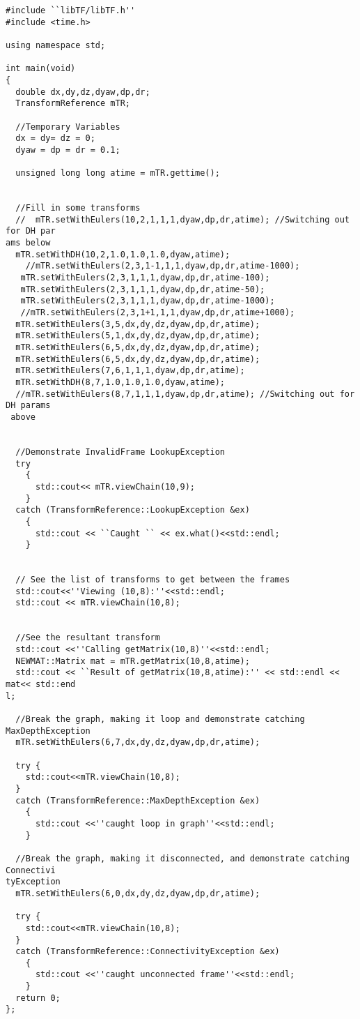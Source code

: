 \documentclass[12pt]{article}
\begin{document}
\begin{verbatim}
#include ``libTF/libTF.h''
#include <time.h>

using namespace std;

int main(void)
{
  double dx,dy,dz,dyaw,dp,dr;
  TransformReference mTR;
  
  //Temporary Variables
  dx = dy= dz = 0;
  dyaw = dp = dr = 0.1;
  
  unsigned long long atime = mTR.gettime();

  
  //Fill in some transforms
  //  mTR.setWithEulers(10,2,1,1,1,dyaw,dp,dr,atime); //Switching out for DH par
ams below
  mTR.setWithDH(10,2,1.0,1.0,1.0,dyaw,atime);
    //mTR.setWithEulers(2,3,1-1,1,1,dyaw,dp,dr,atime-1000);
   mTR.setWithEulers(2,3,1,1,1,dyaw,dp,dr,atime-100);
   mTR.setWithEulers(2,3,1,1,1,dyaw,dp,dr,atime-50);
   mTR.setWithEulers(2,3,1,1,1,dyaw,dp,dr,atime-1000);
   //mTR.setWithEulers(2,3,1+1,1,1,dyaw,dp,dr,atime+1000);
  mTR.setWithEulers(3,5,dx,dy,dz,dyaw,dp,dr,atime);
  mTR.setWithEulers(5,1,dx,dy,dz,dyaw,dp,dr,atime);
  mTR.setWithEulers(6,5,dx,dy,dz,dyaw,dp,dr,atime);
  mTR.setWithEulers(6,5,dx,dy,dz,dyaw,dp,dr,atime);
  mTR.setWithEulers(7,6,1,1,1,dyaw,dp,dr,atime);
  mTR.setWithDH(8,7,1.0,1.0,1.0,dyaw,atime);
  //mTR.setWithEulers(8,7,1,1,1,dyaw,dp,dr,atime); //Switching out for DH params
 above
  
  
  //Demonstrate InvalidFrame LookupException
  try
    {
      std::cout<< mTR.viewChain(10,9);
    }
  catch (TransformReference::LookupException &ex)
    {
      std::cout << ``Caught `` << ex.what()<<std::endl;
    }
  
  
  // See the list of transforms to get between the frames
  std::cout<<''Viewing (10,8):''<<std::endl;  
  std::cout << mTR.viewChain(10,8);
  
  
  //See the resultant transform
  std::cout <<''Calling getMatrix(10,8)''<<std::endl;
  NEWMAT::Matrix mat = mTR.getMatrix(10,8,atime);  
  std::cout << ``Result of getMatrix(10,8,atime):'' << std::endl << mat<< std::end
l;
  
  //Break the graph, making it loop and demonstrate catching MaxDepthException
  mTR.setWithEulers(6,7,dx,dy,dz,dyaw,dp,dr,atime);
  
  try {
    std::cout<<mTR.viewChain(10,8);
  }
  catch (TransformReference::MaxDepthException &ex)
    {
      std::cout <<''caught loop in graph''<<std::endl;
    }
  
  //Break the graph, making it disconnected, and demonstrate catching Connectivi
tyException
  mTR.setWithEulers(6,0,dx,dy,dz,dyaw,dp,dr,atime);

  try {
    std::cout<<mTR.viewChain(10,8);
  }
  catch (TransformReference::ConnectivityException &ex)
    {
      std::cout <<''caught unconnected frame''<<std::endl;
    }  
  return 0;
};

\end{verbatim}
\end{document}
